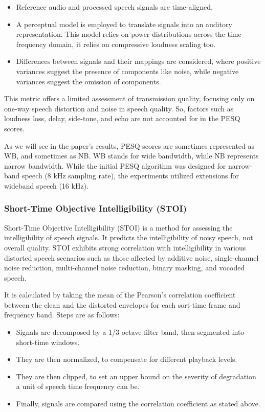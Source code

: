 \begin{itemize}
    \item Reference audio and processed speech signals are time-aligned. 
    \item A perceptual model is employed to translate signals into an auditory representation. This model relies on power distributions across the time-frequency domain, it relies on compressive loudness scaling too. 
    \item Differences between signals and their mappings are considered, where positive variances suggest the presence of components like noise, while negative variances suggest the omission of components.
\end{itemize}

This metric offers a limited assessment of transmission quality, focusing only on one-way speech distortion and noise in speech quality. So, factors such as loudness loss, delay, side-tone, and echo are not accounted for in the PESQ scores.

As we will see in the paper's results, PESQ scores are sometimes represented as WB, and sometimes as NB. WB stands for wide bandwidth, while NB represents narrow bandwidth. While the initial PESQ algorithm was designed for narrow-band speech (8 kHz sampling rate), the experiments utilized extensions for wideband speech (16 kHz).


\subsubsection{Short-Time Objective Intelligibility (STOI)}
Short-Time Objective Intelligibility (STOI) is a method for assessing the intelligibility of speech signals. It predicts the intelligibility of noisy speech, not overall quality. STOI exhibits strong correlation with intelligibility in various distorted speech scenarios such as those affected by additive noise, single-channel noise reduction, multi-channel noise reduction, binary masking, and vocoded speech.

It is calculated by taking the mean of the Pearson's correlation coefficient between the clean and the distorted envelopes for each sort-time frame and frequency band. Steps are as follows:

\begin{itemize}
    \item Signals are decomposed by a 1/3-octave filter band, then segmented into short-time windows.
    \item They are then normalized, to compensate for different playback levels.
    \item They are then clipped, to set an upper bound on the severity of degradation a unit of speech time frequency can be.
    \item Finally, signals are compared using the correlation coefficient as stated above.
\end{itemize}

